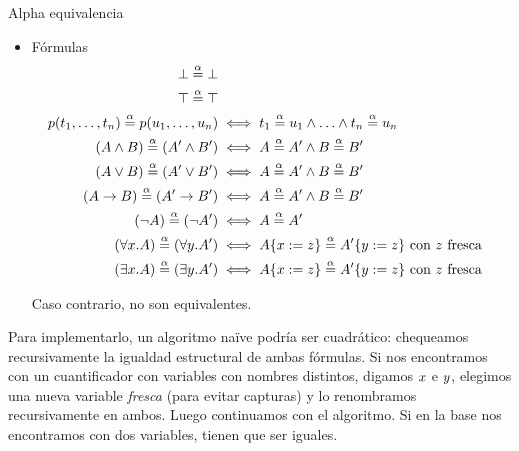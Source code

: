 \begin{definition}{Alpha equivalencia}
\begin{itemize}
        \item Fórmulas
        \begin{align*}    
            \bot \overset{\alpha}{=} \bot
                \\
            \top \overset{\alpha}{=} \top
                \\
            p(t_1, \dots, t_n) \overset{\alpha}{=} p(u_1, \dots, u_n)
                &\iff
                t_1 \overset{\alpha}{=} u_1 \wedge
                \dotso \wedge
                t_n \overset{\alpha}{=} u_n
                \\
            (A \wedge B) \overset{\alpha}{=} (A' \wedge B')
                &\iff
                A \overset{\alpha}{=} A' \wedge B \overset{\alpha}{=} B'
                \\
            (A \vee B) \overset{\alpha}{=} (A' \vee B')
                &\iff
                A \overset{\alpha}{=} A' \wedge B \overset{\alpha}{=} B'
                \\
            (A \to B) \overset{\alpha}{=} (A' \to B')
                &\iff
                A \overset{\alpha}{=} A' \wedge B \overset{\alpha}{=} B'
                \\
            (\neg A) \overset{\alpha}{=} (\neg A')
                &\iff
                A \overset{\alpha}{=} A'
                \\
            (\forall x . A) \overset{\alpha}{=} (\forall y . A')
                &\iff
                A \{x := z\} \overset{\alpha}{=}
                A' \{y := z\} \text{ con $z$ fresca}
                \\
            (\exists x . A) \overset{\alpha}{=} (\exists y . A')
                &\iff
                A \{x := z\} \overset{\alpha}{=}
                A' \{y := z\} \text{ con $z$ fresca}
                \\
        \end{align*}

        Caso contrario, no son equivalentes.

    \end{itemize}
\end{definition}

Para implementarlo, un algoritmo naïve podría ser cuadrático: chequeamos recursivamente la igualdad estructural de ambas fórmulas. Si nos encontramos con un cuantificador con variables con nombres distintos, digamos $x$ e $y$, elegimos una nueva variable \textit{fresca} (para evitar capturas) y lo renombramos recursivamente en ambos. Luego continuamos con el algoritmo. Si en la base nos encontramos con dos variables, tienen que ser iguales.

